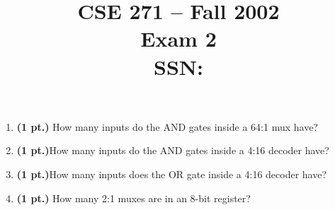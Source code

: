 \documentclass{article}
\begin{document}
\newcommand{\bs}{\backslash}


\title{
\Huge{CSE 271 -- Fall 2002}\\
\normalsize{Exam 2}\\
SSN:}
\date{}

\maketitle{}

\begin{enumerate}
\item {\bf (1 pt.)} How many inputs do the AND gates inside a 64:1 mux have?

\item {\bf (1 pt.)}How many inputs do the AND gates inside a 4:16 decoder have?

\item {\bf (1 pt.)}How many inputs does the OR gate inside a 4:16 decoder have?

\item {\bf (1 pt.)} How many 2:1 muxes are in an 8-bit register?


\end{enumerate}
\end{document}
